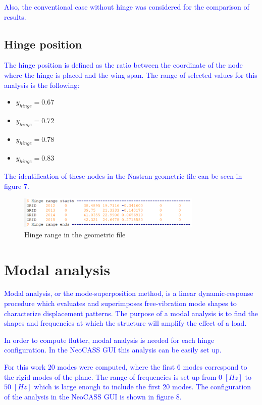 \documentclass[conference]{IEEEtran}
\newlength\figureheight
\newlength\figurewidth
\begin{document}
\textcolor{blue}{Also, the conventional case without hinge was considered for the comparison of results.}

\subsection{Hinge position}
\textcolor{blue}{The hinge position is defined as the ratio between the coordinate of the node where the hinge is placed and the wing span. The range of  selected values for this analysis is the following:}

\begin{itemize}
    \item $y_{hinge} = 0.67$
    \item $y_{hinge} = 0.72$
    \item $y_{hinge} = 0.78$
    \item $y_{hinge} = 0.83$
\end{itemize}

\textcolor{blue}{The identification of these nodes in the Nastran geometric file can be seen in figure 7.}

\begin{figure}[htp]
  \centering
  \setlength\figureheight{5cm}
  \setlength\figurewidth{6cm}
  \includegraphics[width=250pt]{images/HingeRange.png}
  \caption{Hinge range in the geometric file}
  \label{fig:my-figure}
\end{figure}


\section{Modal analysis}
\textcolor{blue}{Modal analysis, or the mode-superposition method, is a linear dynamic-response procedure which evaluates and superimposes free-vibration mode shapes to characterize displacement patterns. The purpose of a modal analysis is to find the shapes and frequencies at which the structure will amplify the effect of a load.}

\textcolor{blue}{In order to compute flutter, modal analysis is needed for each hinge configuration. In the NeoCASS GUI this analysis can be easily set up.}

\textcolor{blue}{For this work 20 modes were computed, where the first 6 modes correspond to the rigid modes of the plane. The range of frequencies is set up from $0\;[Hz]$ to $50\;[Hz]$ which is large enough to include the first 20 modes. The configuration of the analysis in the NeoCASS GUI is shown in figure 8.}
\end{document}
